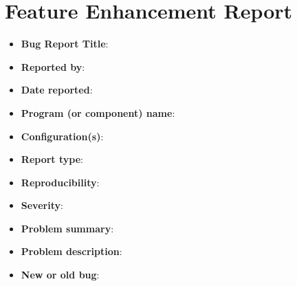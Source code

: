 \documentclass[fontsize=12pt,paper=letter,twoside]{scrartcl}
\begin{document}
\newpage
\section{Feature Enhancement Report}

\begin{itemize}
\item \textbf{Bug Report Title}:
\item \textbf{Reported by}:
\item \textbf{Date reported}:
\item \textbf{Program (or component) name}:
\item \textbf{Configuration(s)}:
\item \textbf{Report type}:
\item \textbf{Reproducibility}:
\item \textbf{Severity}:
\item \textbf{Problem summary}:
\item \textbf{Problem description}:
\item \textbf{New or old bug}:
\end{itemize}
\end{document}

